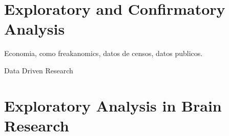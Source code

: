 
\section{Exploratory and Confirmatory Analysis}



Economia, como freakanomics, datos de censos, datos publicos.

Data Driven Research

\section{Exploratory Analysis in Brain Research}


